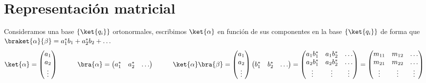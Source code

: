 \documentclass{report}
\begin{document}
    \section{Representación matricial}
    \noindent Consideramos una base $\left\{\ket{q_i}\right\}$ ortonormales, escribimos
    $\ket{\alpha}$ en función de sus componentes en la base $\left\{\ket{q_i}\right\}$ 
    de forma que $\braket{\alpha}{\beta}=\begin{matrix}a_1^*b_1+a_2^*b_2+\dots\end{matrix}$
    \[\ket{\alpha}=\left(\begin{matrix}a_1\\ a_2\\ \vdots\end{matrix}\right)\hspace{1cm}\bra{\alpha}=\left(\begin{matrix}a_1^* &a_2^* &\dots\end{matrix}\right)
    \hspace{1cm}\ket{\alpha}\bra{\beta}=\left(\begin{matrix}a_1\\a_2\\\vdots\end{matrix}\right)\left(\begin{matrix}b_1^* &b_2^* &\dots\end{matrix}\right)=
    \left(\begin{matrix}a_1b_1^* &a_1b_2^* &\dots\\ a_2b_1^* &a_2b_2^* &\dots\\ \vdots &\vdots &\vdots \end{matrix}\right)=
    \left(\begin{matrix}m_{11} &m_{12} & \dots\\m_{21} &m_{22} & \dots\\ \vdots &\vdots &\vdots\end{matrix}\right)\]
\end{document}
